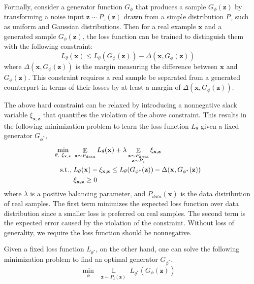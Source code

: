 \documentclass[11pt,fullpage, letterpaper,twoside]{article}
\newcommand{\1}[1]{\mathds{1}_{\left[#1\right]}}
\begin{document}
Formally, consider a generator function $G_\phi$ that produces a sample  $G_\phi(\mathbf z)$ by transforming a noise input $\mathbf z\sim P_z(\mathbf z)$ drawn from a simple distribution $P_z$ such as uniform and Gaussian distributions.
Then for
a real example $\mathbf x$ and a generated sample $G_\phi(\mathbf z)$, the loss function can be trained to distinguish them with the following constraint:
\begin{equation}\label{eq:ls}
L_\theta(\mathbf x) \leq L_\theta(G_\phi(\mathbf z))- \Delta(\mathbf x,G_\phi(\mathbf z))
\end{equation}
where $\Delta(\mathbf x,G_\phi(\mathbf z))$ is the margin measuring the difference between $\mathbf x$ and $G_\phi(\mathbf z)$. This constraint requires a real sample be separated from a generated counterpart in terms of their losses by at least a margin of $\Delta(\mathbf x,G_\phi(\mathbf z))$.

The above hard constraint can be relaxed by introducing a nonnegative slack variable $\xi_{\mathbf x,\mathbf z}$
that quantifies the violation of the above constraint. This results in the following minimization problem to learn the loss function $L_\theta$ given a fixed generator $G_{\phi^*}$,
\begin{align}\label{eq:loss}
\min_{\theta,~\xi_{\mathbf x,\mathbf z}} ~&\mathop \mathbb E\limits_{\mathbf x\sim P_{data}} L_\theta(\mathbf x) + \lambda \mathop \mathbb E\limits_{\substack{\mathbf x\sim P_{data} \\ \mathbf z\sim P_z}}\xi_{\mathbf x,\mathbf z}\\
{\rm s.t.,}~ &L_\theta(\mathbf x) - \xi_{\mathbf x,\mathbf z} \leq L_\theta(G_{\phi^*}(\mathbf z)) - \Delta(\mathbf x, G_{\phi^*}(\mathbf z))\nonumber\\
&\xi_{\mathbf x,\mathbf z} \ge 0\nonumber
\end{align}
where $\lambda$ is a positive balancing parameter, and $P_{data}(\mathbf x)$ is the data distribution of real samples.  The first term minimizes the expected loss function over data distribution since a smaller loss is preferred on real samples. The second term is the expected error caused by the violation of the constraint. Without loss of generality, we require the loss function should be nonnegative.






Given a fixed loss function $L_{\theta^*}$, on the other hand, one can solve the following minimization problem to find an optimal generator $G_{\phi^*}$.
\begin{equation}\label{eq:generator}
\min_{\phi}~\mathop \mathbb E\limits_{\substack{\mathbf z\sim P_z(\mathbf z)}} L_{\theta^*}(G_\phi(\mathbf z))
\end{equation}
\end{document}
